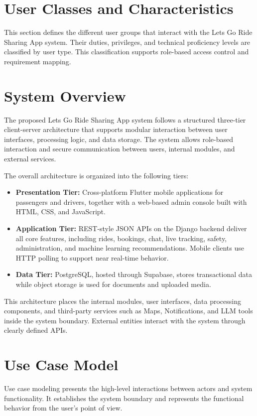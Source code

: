\section{User Classes and Characteristics}

This section defines the different user groups that interact with the Lets Go Ride Sharing App system. Their duties, privileges, and technical proficiency levels are classified by user type. This classification supports role-based access control and requirement mapping.
\section{System Overview}

The proposed Lets Go Ride Sharing App system follows a structured three-tier client-server architecture that supports modular interaction between user interfaces, processing logic, and data storage. The system allows role-based interaction and secure communication between users, internal modules, and external services.

The overall architecture is organized into the following tiers:

\begin{itemize}
    \item \textbf{Presentation Tier:} Cross-platform Flutter mobile applications for passengers and drivers, together with a web-based admin console built with HTML, CSS, and JavaScript.
    \item \textbf{Application Tier:} REST-style JSON APIs on the Django backend deliver all core features, including rides, bookings, chat, live tracking, safety, administration, and machine learning recommendations. Mobile clients use HTTP polling to support near real-time behavior.
    \item \textbf{Data Tier:} PostgreSQL, hosted through Supabase, stores transactional data while object storage is used for documents and uploaded media.
\end{itemize}

This architecture places the internal modules, user interfaces, data processing components, and third-party services such as Maps, Notifications, and LLM tools inside the system boundary. External entities interact with the system through clearly defined APIs.
\section{Use Case Model}

Use case modeling presents the high-level interactions between actors and system functionality. It establishes the system boundary and represents the functional behavior from the user's point of view.
